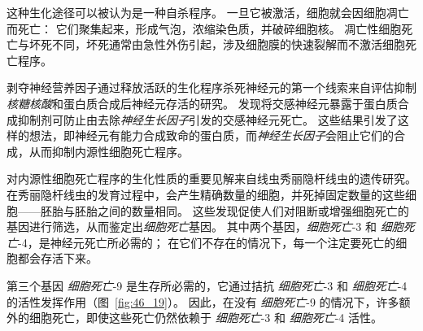 这种生化途径可以被认为是一种自杀程序。
一旦它被激活，细胞就会因细胞凋亡而死亡：
它们聚集起来，形成气泡，浓缩染色质，并破碎细胞核。
凋亡性细胞死亡与坏死不同，坏死通常由急性外伤引起，涉及细胞膜的快速裂解而不激活细胞死亡程序。


剥夺神经营养因子通过释放活跃的生化程序杀死神经元的第一个线索来自评估抑制\textit{核糖核酸}和蛋白质合成后神经元存活的研究。
发现将交感神经元暴露于蛋白质合成抑制剂可防止由去除\textit{神经生长因子}引发的交感神经元死亡。
这些结果引发了这样的想法，即神经元有能力合成致命的蛋白质，而\textit{神经生长因子}会阻止它们的合成，从而抑制内源性细胞死亡程序。


对内源性细胞死亡程序的生化性质的重要见解来自线虫秀丽隐杆线虫的遗传研究。
在秀丽隐杆线虫的发育过程中，会产生精确数量的细胞，并死掉固定数量的这些细胞——胚胎与胚胎之间的数量相同。
这些发现促使人们对阻断或增强细胞死亡的基因进行筛选，从而鉴定出\textit{细胞死亡}基因。
其中两个基因，\textit{细胞死亡}-3 和 \textit{细胞死亡}-4，是神经元死亡所必需的；
在它们不存在的情况下，每一个注定要死亡的细胞都会存活下来。

第三个基因 \textit{细胞死亡}-9 是生存所必需的，它通过拮抗 \textit{细胞死亡}-3 和 \textit{细胞死亡}-4 的活性发挥作用（图~\ref{fig:46_19}）。
因此，在没有 \textit{细胞死亡}-9 的情况下，许多额外的细胞死亡，即使这些死亡仍然依赖于 \textit{细胞死亡}-3 和 \textit{细胞死亡}-4 活性。


